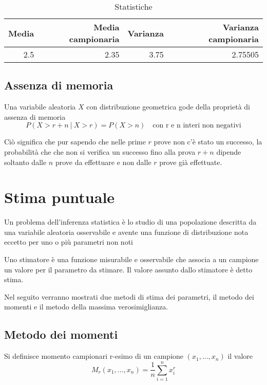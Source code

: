 \documentclass[]{book}
\begin{document}
\begin{table}

\caption{\label{tab:geometrica-statistiche}Statistiche}
\centering
\begin{tabular}[t]{r|r|r|r}
\hline
Media & Media campionaria & Varianza & Varianza campionaria\\
\hline
2.5 & 2.35 & 3.75 & 2.75505\\
\hline
\end{tabular}
\end{table}

\section{Assenza di memoria}\label{assenza-di-memoria}

Una variabile aleatoria \(X\) con distribuzione geometrica gode della
proprietà di assenza di memoria
\[P(X > r + n \ | \ X > r) = P(X > n) \quad \text{con r e n interi non negativi}\]

Ciò significa che pur sapendo che nelle prime \(r\) prove non c'è stato
un successo, la probabilità che che non si verifica un successo fino
alla prova \(r + n\) dipende soltanto dalle \(n\) prove da effettuare e
non dalle \(r\) prove già effettuate.

\chapter{Stima puntuale}\label{stima-puntuale}

Un problema dell'inferenza statistica è lo studio di una popolazione
descritta da una variabile aleatoria osservabile e avente una funzione
di distribuzione nota eccetto per uno o più parametri non noti

Uno stimatore è una funzione misurabile e osservabile che associa a un
campione un valore per il parametro da stimare. Il valore assunto dallo
stimatore è detto stima.

Nel seguito verranno mostrati due metodi di stima dei parametri, il
metodo dei momenti e il metodo della massima verosimiglianza.

\section{Metodo dei momenti}\label{metodo-dei-momenti}

Si definisce momento campionari r-esimo di un campione \((x_1,...,x_n)\)
il valore \[M_r(x_1,...,x_n) = \frac{1}{n}\sum_{i=1}^nx_i^r\]
\end{document}
